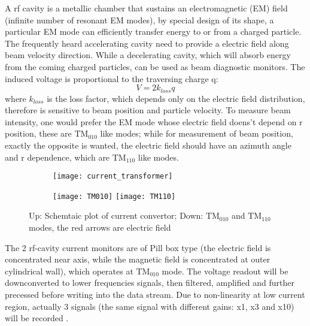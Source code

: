 A rf cavity is a metallic chamber that sustains an electromagnetic (EM) field 
(infinite number of resonant EM modes), by special design of its shape, a particular
EM mode can efficiently transfer energy to or from a charged particle. The 
frequently heard accelerating cavity need to provide a electric field along
beam velocity direction. While a decelerating cavity, which will absorb energy
from the coming charged particles, can be used as beam diagnostic monitors.
The induced voltage is proportional to the traversing charge q:
\begin{equation}
    V = 2k_{loss} q
\end{equation}
where $k_{loss}$ is the loss factor, which depends only on the electric field
distribution, therefore is sensitive to beam position and particle velocity.
To measure beam intensity, one would prefer the EM mode whose electric field
doens't depend on r position, these are $\text{TM}_{\text{010}}$ like modes;
while for measurement of beam position, exactly the opposite is wanted, the
electric field should have an azimuth angle and r dependence, which are $\text{TM}_{\text{110}}$
like modes.
\begin{figure}
    \centering
    \begin{subfigure}[c]{0.5\textwidth}
	\texttt{[image: current\_transformer]}
    \end{subfigure}
    \begin{subfigure}[c]{0.55\textwidth}
	\texttt{[image: TM010]}
	\texttt{[image: TM110]}
    \end{subfigure}
    \caption{Up: Schemtaic plot of current convertor; 
    Down: $\text{TM}_\text{010}$ and $\text{TM}_\text{110}$ modes, the red arrows are electric field}
\end{figure}

The 2 rf-cavity current monitors are of Pill box type (the electric field is
concentrated near axis, while the magnetic field is concentrated at outer
cylindrical wall), which operates at $\text{TM}_\text{010}$ mode. The voltage 
readout will be downconverted to lower frequencies signals, then filtered, 
amplified and further precessed before writing into the data stream. Due to
non-linearity at low current region, actually 3 signals (the same signal with
different gains: x1, x3 and x10) will be recorded \cite{hall_A_equip_manual}.

